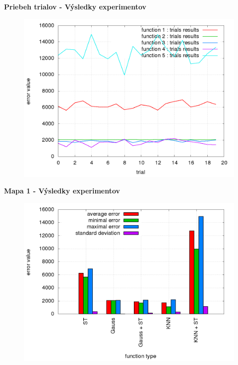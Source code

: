 \documentclass[xcolor=dvipsnames]{beamer}
\begin{document}
\begin{frame}{\bf Priebeh trialov - Výsledky experimentov}

\begin{figure}[!htb]
\centering
\includegraphics[scale=.36]{../../results_q_learning/map_1/trials_average_results_progress.png}
\end{figure}

\end{frame}



\begin{frame}{\bf Mapa 1 - Výsledky experimentov}

\begin{figure}[!htb]
\centering
\includegraphics[scale=.36]{../../results_q_learning/map_1/trials_average_results.png}
\end{figure}

\end{frame}
\end{document}
